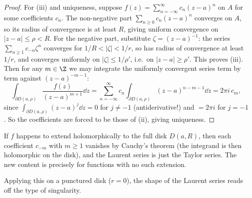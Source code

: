 \begin{proof}
    For (iii) and uniqueness, suppose $f(z) = \sum_{n = -\infty}^{\infty} c_n (z - a)^n$ on $A$ for some coefficients $c_n$. The non-negative part $\sum_{n \geq 0} c_n(z - a)^n$ converges on $A$, so its radius of convergence is at least $R$, giving uniform convergence on $|z - a| \leq \rho < R$. For the negative part, substitute $\zeta = (z - a)^{-1}$: the series $\sum_{n \geq 1} c_{-n} \zeta^n$ converges for $1/R < |\zeta| < 1/r$, so has radius of convergence at least $1/r$, and converges uniformly on $|\zeta| \leq 1/\rho'$, i.e.\ on $|z - a| \geq \rho'$. This proves (iii). Then for any $m \in \Z$ we may integrate the uniformly convergent series term by term against $(z - a)^{-m-1}$:
    $$
    \int_{\partial D(a, \rho)} \frac{f(z)}{(z - a)^{m + 1}} \dd z = \sum_{n = -\infty}^{\infty} c_n \int_{\partial D(a, \rho)} (z - a)^{n - m - 1} \dd z = 2 \pi i \, c_m,
    $$
    since $\int_{\partial D(a, \rho)}(z - a)^{j} \dd z = 0$ for $j \neq -1$ (antiderivative!) and $= 2\pi i$ for $j = -1$. So the coefficients are forced to be those of (ii), giving uniqueness.
\end{proof}

\begin{remark}
    If $f$ happens to extend holomorphically to the full disk $D(a, R)$, then each coefficient $c_{-m}$ with $m \geq 1$ vanishes by Cauchy's theorem (the integrand is then holomorphic on the disk), and the Laurent series is just the Taylor series. The new content is precisely for functions with no such extension.
\end{remark}

Applying this on a punctured disk ($r = 0$), the shape of the Laurent series reads off the type of singularity.

